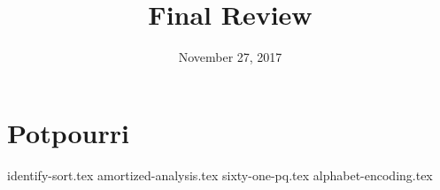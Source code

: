 \documentclass[11pt]{exam}
\title{Final Review}
\date{November 27, 2017}
\begin{document}
\maketitle

\section{Potpourri}
\begin{questions}
{identify-sort.tex}
{amortized-analysis.tex}
{sixty-one-pq.tex}
{alphabet-encoding.tex}
\end{questions}
\end{document}
